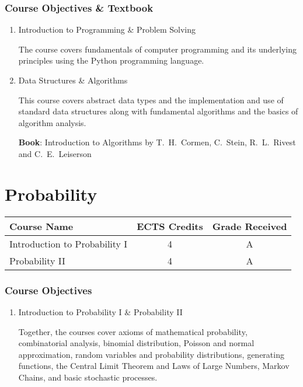 \documentclass[11pt]{article}
\begin{document}
\subsubsection*{Course Objectives \& Textbook}
\begin{enumerate}
    \item Introduction to Programming \& Problem Solving

    The course covers fundamentals of computer programming and its underlying principles using the Python programming language.
    
    \item Data Structures \& Algorithms
    
    This course covers abstract data types and the implementation and use of standard data structures along with fundamental algorithms and the basics of algorithm analysis.
    
    \textbf{Book}: Introduction to Algorithms by T.\ H.\ Cormen, C.\ Stein, R.\ L.\ Rivest and C.\ E.\ Leiserson

\end{enumerate}

\section*{Probability}

\begin{center}
\begin{tabular}{lcc}
Course Name & ECTS Credits & Grade Received \\ \toprule
Introduction to Probability I & 4 & A \\
Probability II & 4 & A
\end{tabular}
\end{center}

\subsubsection*{Course Objectives}
\begin{enumerate}
    \item Introduction to Probability I \& Probability II
     
    Together, the courses cover axioms of mathematical probability, combinatorial analysis, binomial distribution, Poisson and normal approximation, random variables and probability distributions, generating functions, the Central Limit Theorem and Laws of Large Numbers, Markov Chains, and basic stochastic processes.
\end{enumerate}
\end{document}
